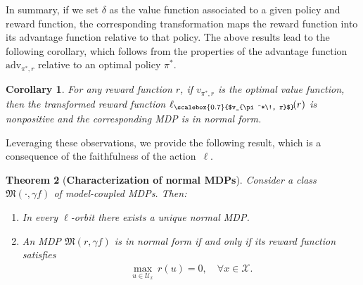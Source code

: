 \documentclass[10pt,leqno]{amsart}
\newcommand{\U}{\mathcal{U}}
\newcommand{\X}{\mathcal{X}}
\newcommand{\cost}{r}
\newcommand{\vvarg}[1]{v_{#1}}
\newcommand{\f}{f}
\newcommand{\policy}{\pi}
\newcommand{\state}{x} %
\newcommand{\act}{u}   %
\newcommand{\disc}{\gamma}
\newcommand{\actAdvsym}{\ell}
\newcommand{\actAdv}[1]{\actAdvsym_{#1}}
\newcommand{\advsym}{\text{adv}}
\newcommand{\adv}[2]{\advsym_{#1, #2}}
\newcommand{\mdp}{\mathfrak{M}}
\newcommand{\mdparg}[2]{\mdp\left(#1, #2\right)}
\newtheorem{theorem}{Theorem}[]
\newtheorem{corollary}[theorem]{Corollary}
\begin{document}
\noindent
In summary, if we set $\delta$ as the value function associated to a given policy and reward function, the corresponding transformation maps the reward function into its advantage function relative to that policy. The above results lead to the following corollary, which follows from the properties of the advantage function $\adv{\policy^*\!}{\cost}$ relative to an optimal policy $\policy^*$.
\begin{corollary}\label{cor:ideal_transformation}
    For any reward function $\cost$, if $\vvarg{\policy^*\!, \cost}$ is the optimal value function, then the transformed reward function $\actAdv{\scalebox{0.7}{$\vvarg{\policy^*\!, \cost}$}}\!(\cost)$ is nonpositive and the corresponding MDP is in normal form.
\end{corollary}
\noindent
Leveraging these observations, we provide the following result, which is a consequence of the faithfulness of the action~$\actAdvsym$.
\begin{theorem}[\textbf{Characterization of normal MDPs}]\label{th:normal_form_characterization}
    Consider a class $\mdparg{\cdot}{\disc \f}$ of model-coupled MDPs. Then:
    \begin{enumerate}[label=(\alph*), ref=\thetheorem-(\alph*)]
        \item\label{lem:uniqueness_of_normal_form} In every $\actAdvsym$-orbit there exists a unique normal MDP.
        \item\label{prop:nec_suff_condition_for_normality} An MDP $\mdparg{\cost}{\disc \f}$ is in normal form if and only if its reward function satisfies
        \begin{align}\label{eq:sufficient_condition_for_normality}
            \max_{\act \in \U_\state}\, \cost(\act) = 0, \quad \forall \state \in \X.
        \end{align}
    \end{enumerate}
\end{theorem}
\end{document}
